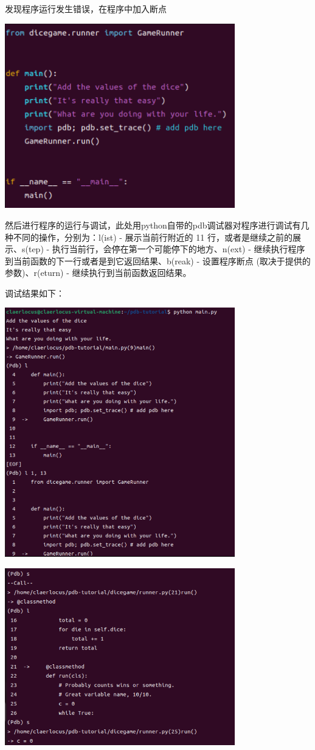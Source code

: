 \documentclass[UTF8,a4paper]{ctexart}
\begin{document}
\begin{sloppypar}
	发现程序运行发生错误，在程序中加入断点
	
	\includegraphics[width = 10cm]{5}
	
	然后进行程序的运行与调试，此处用python自带的pdb调试器对程序进行调试有几种不同的操作，分别为：l(ist) - 展示当前行附近的 11 行，或者是继续之前的展示、s(tep) - 执行当前行，会停在第一个可能停下的地方、n(ext) - 继续执行程序到当前函数的下一行或者是到它返回结果、b(reak) - 设置程序断点 (取决于提供的参数)、r(eturn) - 继续执行到当前函数返回结果。
	
	调试结果如下：
	
	\includegraphics[width = 10cm]{7}
	
	\includegraphics[width = 10cm]{8}
	

\end{sloppypar}
\end{document}
